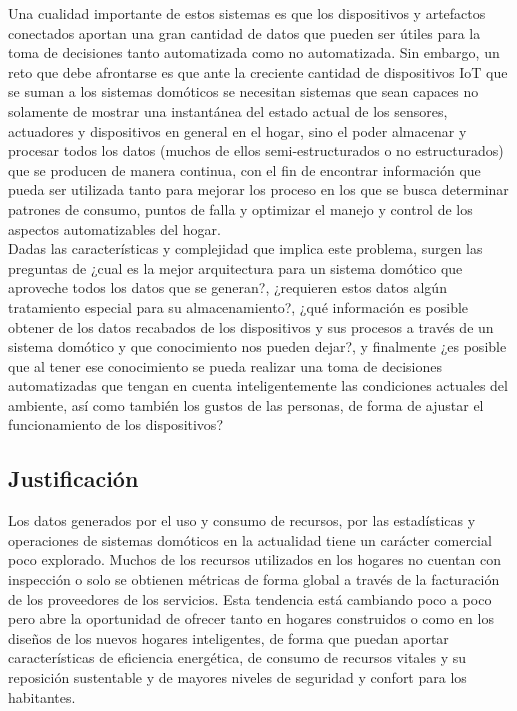 Una cualidad importante de estos sistemas es que los dispositivos y artefactos conectados aportan una gran cantidad de datos que pueden ser útiles para la toma de decisiones tanto automatizada como no automatizada. Sin embargo, un reto que debe afrontarse es que ante la creciente cantidad de dispositivos IoT que se suman a los sistemas domóticos se necesitan sistemas que sean capaces no solamente de mostrar una instantánea del estado actual de los sensores, actuadores y dispositivos en general en el hogar, sino el poder almacenar y procesar todos los datos (muchos de ellos semi-estructurados o no estructurados) que se producen de manera continua, con el fin de encontrar información que pueda ser utilizada tanto para mejorar los proceso en los que se busca determinar patrones de consumo, puntos de falla y optimizar el manejo y control de los aspectos automatizables del hogar.\\

Dadas las características y complejidad que implica este problema, surgen las preguntas de ¿cual es la mejor arquitectura para un sistema domótico que aproveche todos los datos que se generan?, ¿requieren estos datos algún tratamiento especial para su almacenamiento?, ¿qué información es posible obtener de los datos recabados de los dispositivos y sus procesos a través de un sistema domótico y que conocimiento nos pueden dejar?, y finalmente ¿es posible que al tener ese conocimiento se pueda realizar una toma de decisiones automatizadas que tengan en cuenta inteligentemente las condiciones actuales del ambiente, así como también los gustos de las personas, de forma de ajustar el funcionamiento de los dispositivos?

\subsection{Justificación}
Los datos generados por el uso y consumo de recursos, por las estadísticas y operaciones de sistemas domóticos en la actualidad tiene un carácter comercial poco explorado. Muchos de los recursos utilizados en los hogares no cuentan con inspección o solo se obtienen métricas de forma global a través de la facturación de los proveedores de los servicios. Esta tendencia está cambiando poco a poco pero abre la oportunidad de ofrecer tanto en hogares construidos o como en los diseños de los nuevos hogares inteligentes, de forma que puedan aportar características de eficiencia energética, de consumo de recursos vitales y su reposición sustentable y de mayores niveles de seguridad y confort para los habitantes.\\


